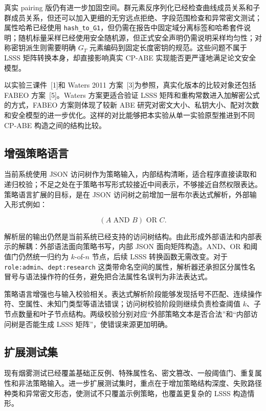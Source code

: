 真实 pairing 版仍有进一步加固空间。群元素反序列化已经检查曲线成员关系和子群成员关系，但还可以加入更细的无穷远点拒绝、字段范围检查和异常密文测试；属性哈希已经使用 \verb|hash_to_G1|，但仍需在报告中固定域分离标签和哈希套件说明；随机标量采样已经使用安全随机源，但正式安全声明仍需说明采样均匀性；对称密钥派生则需要明确 $G_T$ 元素编码到固定长度密钥的规范。这些问题不属于 LSSS 矩阵转换本身，却直接影响真实 CP-ABE 实现能否更严谨地满足论文安全模型。

以实验三课件~[1]和 Waters 2011 方案~[3]为参照，真实化版本的比较对象还包括 FABEO 方案~[5]。Waters 方案更适合验证 LSSS 矩阵和重构常数进入加解密公式的方式，FABEO 方案则体现了较新 ABE 研究对密文大小、私钥大小、配对次数和安全模型的进一步优化。这样的对比能够把本实验从单一实验原型推进到不同 CP-ABE 构造之间的结构比较。

\subsection{增强策略语言}

当前系统使用 JSON 访问树作为策略输入，内部结构清晰，适合程序直接读取和递归校验；不足之处在于策略书写形式较接近中间表示，不够接近自然权限表达。策略语言扩展的目标，是在 JSON 访问树之前增加一层布尔表达式解析，外部输入形式例如：

\[
    (A \text{ AND } B) \text{ OR } C.
\]

解析层的输出仍然是当前系统已经支持的访问树结构。由此形成外部语法和内部表示的解耦：外部语法面向策略书写，内部 JSON 面向矩阵构造。AND、OR 和阈值门仍然统一归约为 $k$-of-$n$ 节点，后续 LSSS 转换函数无需改变。对于 \verb|role:admin|、\verb|dept:research| 这类带命名空间的属性，解析器还承担区分属性名冒号与语法操作符的任务，避免把合法属性名误判为非法表达式。

策略语言增强也与输入校验相关。表达式解析阶段能够发现括号不匹配、连续操作符、空属性、未知门类型等语法错误；访问树校验阶段则继续负责检查阈值 $k$、子节点数量和叶子节点结构。两级校验分别对应“外部策略文本是否合法”和“内部访问树是否能生成 LSSS 矩阵”，使错误来源更加明确。

\subsection{扩展测试集}

现有烟雾测试已经覆盖基础正反例、特殊属性名、密文篡改、一般阈值门、重复属性和非法策略输入。进一步扩展测试集时，重点在于增加策略结构深度、失败路径种类和异常密文形态，使测试不只覆盖示例策略，也覆盖更复杂的 LSSS 构造情形。

